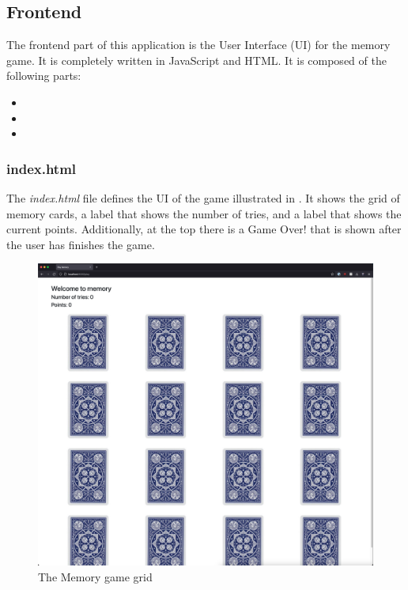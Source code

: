 \newpage
\subsection{Frontend}\label{subsec:03_impl_frontend}
The frontend part of this application is the User Interface (UI) for the memory game. It is completely written in JavaScript and HTML.
%
It is composed of the following parts:
\begin{itemize}
\item {}
\item {}
\item {}
\end{itemize}

\subsubsection{index.html}\label{subsubsec:03_impl_frontend_index}
The \textit{index.html} file defines the UI of the game illustrated in . It shows the grid of memory cards, a label that shows the number of tries, and a label that shows the current points. Additionally, at the top there is a Game Over! that is shown after the user has finishes the game.
\begin{figure}[h]
\centering
\includegraphics[scale=0.2]{images/03_impl/frontend/grid}
\caption{The Memory game grid}
\label{fig:03_impl_frontend_index_grid}
\end{figure}

